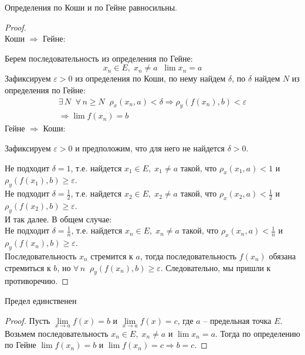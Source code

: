 \begin{theorem-non}
    Определения по Коши и по Гейне равносильны.
\end{theorem-non}
\begin{proof} \quad \\
    Коши $\Rightarrow$ Гейне: 
    
    Берем последовательность из определения по Гейне:
    \[ x_n \in E, \; x_n \neq a \;\; \lim x_n = a \]
    Зафиксируем $\varepsilon > 0$ из определения по Коши, по нему найдем $\delta$, по $\delta$ найдем $N$ из определения по Гейне:
    \begin{gather*}
        \exists \, N \;\; \forall \, n \geqslant N \;\; \rho_x(x_n, a) < \delta \Rightarrow \rho_y(f(x_n), b) < \varepsilon \\
        \Rightarrow \lim f(x_n) = b
    \end{gather*}
    Гейне $\Rightarrow$ Коши:

    Зафиксируем $\varepsilon > 0$ и предположим, что для него не найдется $\delta > 0$.

    Не подходит $\delta = 1$, т.е. найдется $x_1 \in E, \; x_1 \neq a$ такой, что $\rho_x(x_1, a) < 1$ и $\rho_y(f(x_1), b) \geqslant \varepsilon$. \\
    Не подходит $\delta = \frac{1}{2}$, т.е. найдется $x_2 \in E, \; x_2 \neq a$ такой, что $\rho_x(x_2, a) < \frac{1}{2}$ и $\rho_y(f(x_2), b) \geqslant \varepsilon$. \\
    И так далее. В общем случае: \\
    Не подходит $\delta = \frac{1}{n}$, т.е. найдется $x_n \in E, \; x_n \neq a$ такой, что $\rho_x(x_n, a) < \frac{1}{n}$ и $\rho_y(f(x_n), b) \geqslant \varepsilon$. \\
    
    Последовательность $x_n$ стремится к $a$, тогда последовательность $f(x_n)$ обязана стремиться к $b$, но $\forall \, n \;\; \rho_y(f(x_n), b) \geqslant \varepsilon$. 
    Следовательно, мы пришли к противоречию.
\end{proof}

\begin{follow} 
    Предел единственен
\end{follow}
\begin{proof}
    Пусть $\lim\limits_{x \to a} f(x) = b$ и $\lim\limits_{x \to a} f(x) = c$, где $a$ -- предельная точка $E$. 
    Возьмем последовательность $x_n \in E, \; x_n \neq a$ и $\lim x_n = a$. 
    Тогда по определению по Гейне $\lim f(x_n) = b$ и $\lim f(x_n) = c \Rightarrow b = c$.  
\end{proof}